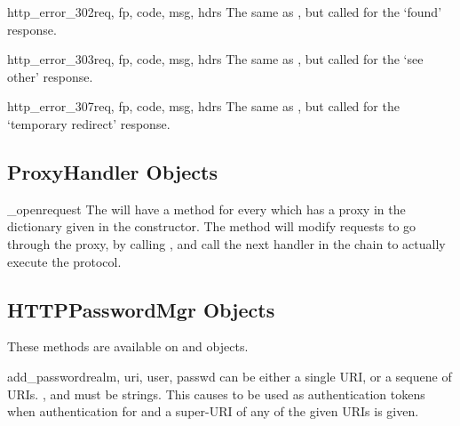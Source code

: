 \begin{methoddesc}[HTTPRedirectHandler]{http_error_302}{req,
                                                  fp, code, msg, hdrs}
The same as , but called for the
`found' response.
\end{methoddesc}

\begin{methoddesc}[HTTPRedirectHandler]{http_error_303}{req,
                                                  fp, code, msg, hdrs}
The same as , but called for the
`see other' response.
\end{methoddesc}

\begin{methoddesc}[HTTPRedirectHandler]{http_error_307}{req,
                                                  fp, code, msg, hdrs}
The same as , but called for the
`temporary redirect' response.

\subsection{ProxyHandler Objects \label{proxy-handler}}

\begin{methoddescni}[ProxyHandler]{_open}{request}
The  will have a method
 for every  which has a
proxy in the  dictionary given in the constructor.  The
method will modify requests to go through the proxy, by calling
, and call the next handler in the chain to
actually execute the protocol.
\end{methoddescni}


\subsection{HTTPPasswordMgr Objects \label{http-password-mgr}}

These methods are available on  and
 objects.

\begin{methoddesc}[HTTPPasswordMgr]{add_password}{realm, uri, user, passwd}
 can be either a single URI, or a sequene of URIs. ,
 and  must be strings. This causes
 to be used as authentication tokens
when authentication for  and a super-URI of any of the
given URIs is given.
\end{methoddesc}  


\end{methoddesc}
